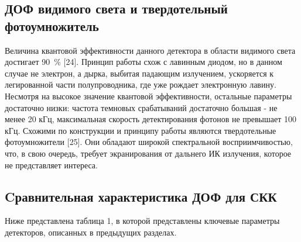 \subsection{ДОФ видимого света и твердотельный фотоумножитель} \label{subsec:ch1/sec5/sub6}

Величина квантовой эффективности данного детектора в области видимого света достигает 90~\% [24]. Принцип работы схож с лавинным диодом, но в данном случае не электрон, а дырка, выбитая падающим излучением, ускоряется к легированной части полупроводника, где уже рождает электронную лавину. Несмотря на высокое значение квантовой эффективности, остальные параметры достаточно низки: частота темновых срабатываний достаточно большая - не менее 20 кГц, максимальная скорость детектирования фотонов не превышает 100 кГц. Схожими по конструкции и принципу работы являются твердотельные фотоумножители [25]. Они обладают широкой спектральной восприимчивостью, что, в свою очередь, требует экранирования от дальнего ИК излучения, которое не представляет интереса.

\subsection{Cравнительная характеристика ДОФ для СКК} \label{subsec:ch1/sec5/sub7}

Ниже представлена таблица 1, в которой представлены ключевые параметры детекторов, описанных в предыдущих разделах.


